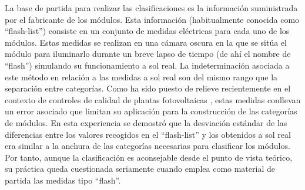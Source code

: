 La base de partida para realizar las clasificaciones es la información
suministrada por el fabricante de los módulos. Esta información (habitualmente
conocida como {}``flash-list'') consiste en un conjunto de medidas
eléctricas para cada uno de los módulos. Estas medidas se realizan
en una cámara oscura en la que se sitúa el módulo para iluminarlo
durante un breve lapso de tiempo (de ahí el nombre de {}``flash'')
simulando su funcionamiento a sol real. La indeterminación asociada
a este método en relación a las medidas a sol real son del mismo rango
que la separación entre categorías. Como ha sido puesto de relieve
recientemente en el contexto de controles de calidad de plantas fotovoltaicas
\cite{Lorenzo.Moreton.ea2008}, estas medidas conllevan un error
asociado que limitan su aplicación para la construcción de las categorías
de módulos. En esta experiencia se demostró que la desviación estándar
de las diferencias entre los valores recogidos en el {}``flash-list''
y los obtenidos a sol real era similar a la anchura de las categorías
necesarias para clasificar los módulos. Por tanto, aunque la clasificación
es aconsejable desde el punto de vista teórico, su práctica queda
cuestionada seriamente cuando emplea como material de partida las
medidas tipo {}``flash''.

